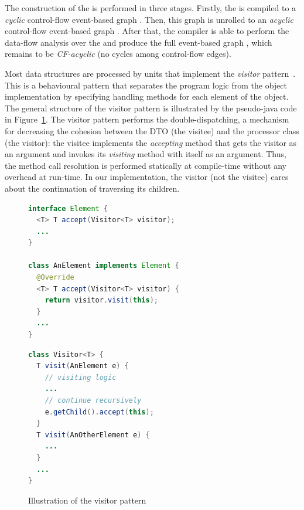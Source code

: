 The construction of the \xgraph{} is performed in three stages.
Firstly, the \ytree{} is compiled to a \textit{cyclic} control-flow event-based graph \xgraph[CF].
Then, this graph is unrolled to an \textit{acyclic} control-flow event-based graph \xgraphU[CF].
After that, the compiler is able to perform the data-flow analysis over the \xgraphU[CF] and produce the full event-based graph \xgraphU[CF+DF], which remains to be \textit{CF-acyclic} (no cycles among control-flow edges).

Most data structures are processed by units that implement the \textit{visitor} pattern~\cite{palsberg1998essence}.
This is a behavioural pattern that separates the program logic from the object implementation by specifying handling methods for each element of the object.
The general structure of the visitor pattern is illustrated by the pseudo-java code in Figure~\ref{fig:visitor}.
The visitor pattern performs the double-dispatching, a mechanism for decreasing the cohesion between the DTO (the visitee) and the processor class (the visitor): the visitee implements the \textit{accepting} method that gets the visitor as an argument and invokes its \textit{visiting} method with itself as an argument.
Thus, the method call resolution is performed statically at compile-time without any overhead at run-time.
In our implementation, the visitor (not the visitee) cares about the continuation of traversing its children.

\begin{figure}[h]
\centering
\begin{minipage}[t]{.55\textwidth}
\begin{lstlisting}[language=java]
interface Element {
  <T> T accept(Visitor<T> visitor);
  ...
}

class AnElement implements Element {
  @Override
  <T> T accept(Visitor<T> visitor) {
    return visitor.visit(this);
  }
  ...
}
\end{lstlisting}
\end{minipage}
\begin{minipage}[t]{.45\textwidth}
\begin{lstlisting}[language=java]
class Visitor<T> {
  T visit(AnElement e) {
    // visiting logic
    ...
    // continue recursively
    e.getChild().accept(this);
  }
  T visit(AnOtherElement e) {
    ...
  }
  ...
}
\end{lstlisting}
\end{minipage}
\caption{Illustration of the visitor pattern}
\label{fig:visitor}
\end{figure}

